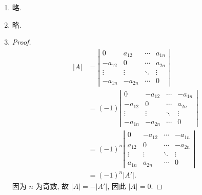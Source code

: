 % 
\begin{enumerate}
    \item %
        略.
    \item %
        略.
    \item %
        \begin{proof}
            \begin{align*}
                |A| &=
                \left|
                    \begin{array}{cccc}
                        0 & a_{12} & \cdots & a_{1n} \\
                        -a_{12} & 0 & \cdots & a_{2n} \\
                        \vdots & \vdots & \ddots & \vdots \\
                        -a_{1n} & -a_{2n} & \cdots & 0
                    \end{array}
                \right| \\
                &= (-1)
                \left|
                    \begin{array}{cccc}
                        0 & -a_{12} & \cdots & -a_{1n} \\
                        -a_{12} & 0 & \cdots & a_{2n} \\
                        \vdots & \vdots & \ddots & \vdots \\
                        -a_{1n} & -a_{2n} & \cdots & 0
                    \end{array}
                \right| \\
                &= (-1)^n
                \left|
                    \begin{array}{cccc}
                        0 & -a_{12} & \cdots & -a_{1n} \\
                        a_{12} & 0 & \cdots & -a_{2n} \\
                        \vdots & \vdots & \ddots & \vdots \\
                        a_{1n} & a_{2n} & \cdots & 0
                    \end{array}
                \right| \\
                &= (-1)^n|A'|.
            \end{align*}
            因为 $n$ 为奇数, 故 $|A| = -|A'|$, 因此 $|A| = 0$.

\end{proof}
\end{enumerate}
